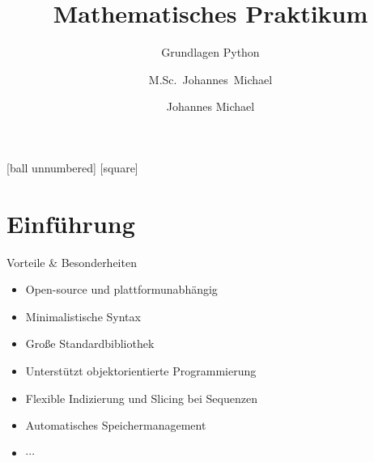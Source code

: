 \documentclass[utf8, smaller, c]{beamer}
\begin{document}
	\author{M.Sc.~Johannes~Michael}
	\date[22.~Oktober~2021]{Johannes Michael}
	\title{Mathematisches Praktikum}
	\subtitle{Grundlagen Python}

	\frame{\maketitle}


    [ball unnumbered]
    [square]
 	\frame{\tableofcontents}
 	
%

\section{Einführung}
\begin{frame}{Vorteile \& Besonderheiten}
	\begin{itemize}
		\item Open-source und plattformunabhängig
		\item Minimalistische Syntax
		\item Große Standardbibliothek
		
		\item Unterstützt objektorientierte Programmierung
		\item Flexible Indizierung und Slicing bei Sequenzen
		\item Automatisches Speichermanagement
		\item $\cdots$
	\end{itemize}
\end{frame}
\end{document}
